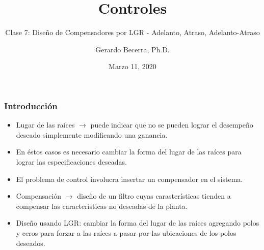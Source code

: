\documentclass[aspectratio=169,handout]{beamer}
\title{Controles}
\subtitle{\small Clase 7: Diseño de Compensadores por LGR - Adelanto, Atraso, Adelanto-Atraso}
\author{Gerardo Becerra, Ph.D.}
\institute{Pontificia Universidad Javeriana\\ Departamento de Electrónica}
\date{Marzo 11, 2020}
\theoremstyle{definition}
\theoremstyle{plain}
\theoremstyle{remark}
\begin{document}
\frame{\titlepage}	

\begin{frame}[<+->]\frametitle{Introducción}
\vspace*{5mm}
\centering
\begin{itemize}
	\item Lugar de las raíces $\rightarrow$ puede indicar que no se pueden lograr el desempeño deseado simplemente modificando una ganancia.
	\item En éstos casos es necesario cambiar la forma del lugar de las raíces para lograr las especificaciones deseadas.
	\item El problema de control involucra insertar un compensador en el sistema.
	\item Compensación $\rightarrow$ diseño de un filtro cuyas carasterísticas tienden a compensar las características no deseadas de la planta.
	\item Diseño usando LGR: cambiar la forma del lugar de las raíces agregando polos y ceros para forzar a las raíces a pasar por las ubicaciones de los polos deseados.
\end{itemize}
\end{frame}
\end{document}
